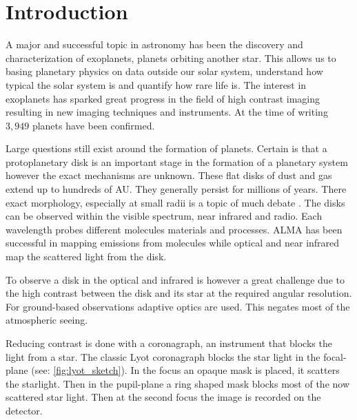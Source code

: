 
\chapter{Introduction} %

\label{ch:intro} %


A major and successful topic in astronomy has been the discovery and characterization of exoplanets, planets orbiting another star. This allows us to basing planetary physics on data outside our solar system, understand how typical the solar system is and quantify how rare life is. The interest in exoplanets has sparked great progress in the field of high contrast imaging resulting in new imaging techniques and instruments. At the time of writing $3,949$ planets have been confirmed. 

Large questions still exist around the formation of planets. Certain is that a protoplanetary disk is an important stage in the formation of a planetary system however the exact mechanisms \cite{yorke1993} \cite{planet_form} \cite{Pollack} are unknown. These flat disks of dust and gas extend up to hundreds of AU. They generally persist for millions of years. There exact morphology, especially at small radii is a topic of much debate \cite{disk_debate}. The disks can be observed within the visible spectrum, near infrared and radio. Each wavelength probes different molecules materials and processes. ALMA has been successful in mapping emissions from molecules while optical and near infrared map the scattered light from the disk.

To observe a disk in the optical and infrared is however a great challenge due to the high contrast between the disk and its star at the required angular resolution. For ground-based observations adaptive optics are used. This negates most of the atmospheric seeing.

Reducing contrast is done with a coronagraph, an instrument that blocks the light from a star. The classic Lyot coronagraph blocks the star light in the focal-plane (see: \autoref{fig:lyot_sketch}). In the focus an opaque mask is placed, it scatters the starlight. Then in the pupil-plane a ring shaped mask blocks most of the now scattered star light. Then at the second focus the image is recorded on the detector.

